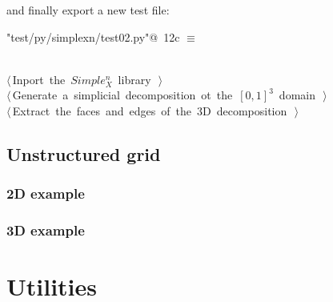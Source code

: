 \documentclass[11pt,oneside]{article}	%
\begin{document}
and finally export a new test file:

\begin{flushleft} \small \label{scrap17}
\protect{}\verb@"test/py/simplexn/test02.py"@\nobreak\ {\footnotesize 12c }$\equiv$
\vspace{-1ex}
\begin{list}{}{} \item
\mbox{}\verb@@\\
\mbox{}\verb@@\hbox{$\langle\,$Inport the $Simple_X^n$ library\nobreak\ {\footnotesize {}}$\,\rangle$}\verb@@\\
\mbox{}\verb@@\hbox{$\langle\,$Generate a simplicial decomposition ot the $[0,1]^3$ domain\nobreak\ {\footnotesize {}}$\,\rangle$}\verb@@\\
\mbox{}\verb@@\hbox{$\langle\,$Extract the faces and edges of the 3D decomposition\nobreak\ {\footnotesize {}}$\,\rangle$}\verb@@\\
\mbox{}\verb@@{\NWsep}
\end{list}
\vspace{-2ex}
\end{flushleft}


\subsection{Unstructured grid}


\subsubsection{2D example}


\subsubsection{3D example}


\appendix
\section{Utilities}
\end{document}
